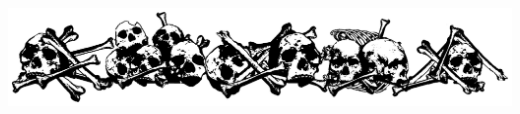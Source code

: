 \vfill

\centerline{\includegraphics[height=1.5in]{art/skulls}}

\clearpage
\squelchbackground

%







\clearpage
\restorebackground

